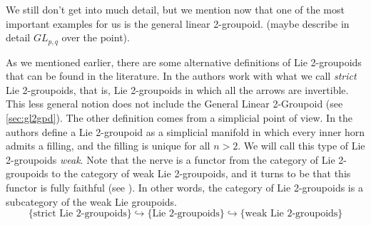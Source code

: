 \begin{example}
We still don't get into much detail, but we mention now that one of the most important examples for us is the general linear 2-groupoid. (maybe describe in detail $GL_{p,q}$ over the point).
\end{example}



As we mentioned earlier, there are some alternative definitions of Lie 2-groupoids that can be found in the literature.
In \cite{gs15} the authors work with what we call \emph{strict} Lie 2-groupoids, that is, Lie 2-groupoids in which all the arrows are invertible.
This less general notion does not include the General Linear 2-Groupoid (see \textsection \ref{sec:gl2gpd}).
The other definition comes from a simplicial point of view.
In \cite{zhu09} the authors define a Lie 2-groupoid as a simplicial manifold in which every inner horn admits a filling, and the filling is unique for all $n>2$.
We will call this type of Lie 2-groupoids \emph{weak}.
Note that the nerve is a functor from the category of Lie 2-groupoids to the category of weak Lie 2-groupoids, and it turns to be that this functor is fully faithful (see \cite[Prop.\ 3.3]{dho20}).
In other words, the category of Lie 2-groupoids is a subcategory of the weak Lie groupoids.
\begin{equation}
\{ \text{strict Lie 2-groupoids} \} \hookrightarrow \{ \text{Lie 2-groupoids} \} \hookrightarrow \{ \text{weak Lie 2-groupoids} \}
\end{equation}

